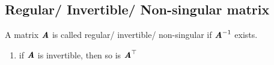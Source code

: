 \subsection{Regular/ Invertible/ Non-singular matrix}

A matrix $\text{\textbf{\textit{A}}}$ is called regular/ invertible/ non-singular if $\text{\textbf{\textit{A}}}^{-1}$ exists.
\hfill \cite{mfml/book/mml/Deisenroth-Faisal-Ong}

\begin{enumerate}
    \item if $\text{\textbf{\textit{A}}}$ is invertible, then so is $\text{\textbf{\textit{A}}}^\top$
    \hfill \cite{mfml/book/mml/Deisenroth-Faisal-Ong}
\end{enumerate}


